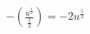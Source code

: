 \documentclass[preview]{standalone}
\begin{document}
\begin{align*}
-\left( \frac{u^{\frac{1}{2}}}{\frac{1}{2}} \right) = -2u^{\frac{1}{2}}
\end{align*}
\end{document}
